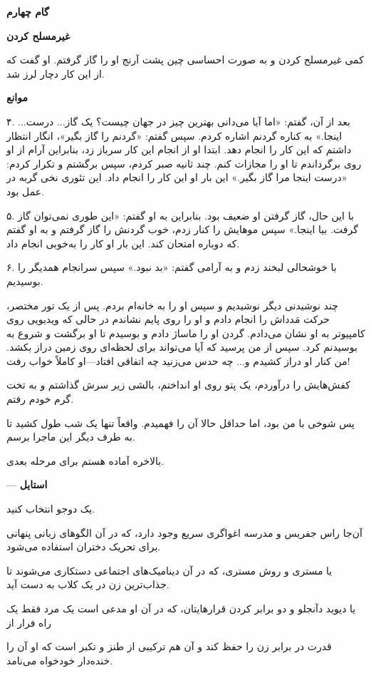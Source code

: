 \textbf{گام چهارم}

\textbf{غیرمسلح کردن}

کمی غیرمسلح کردن و به صورت احساسی چین پشت آرنج او را گاز گرفتم. او گفت که از این کار دچار لرز شد.

\textbf{موانع}

۴. بعد از آن، گفتم: «اما آیا می‌دانی بهترین چیز در جهان چیست؟ یک گاز... درست... اینجا.» به کناره گردنم اشاره کردم. سپس گفتم: «گردنم را گاز بگیر»، انگار انتظار داشتم که این کار را انجام دهد. ابتدا او از انجام این کار سرباز زد، بنابراین آرام از او روی برگرداندم تا او را مجازات کنم. چند ثانیه صبر کردم، سپس برگشتم و تکرار کردم: «درست اینجا مرا گاز بگیر.» این بار او این کار را انجام داد. این تئوری نخی گربه در عمل بود.

۵. با این حال، گاز گرفتن او ضعیف بود. بنابراین به او گفتم: «این طوری نمی‌توان گاز گرفت. بیا اینجا.» سپس موهایش را کنار زدم، خوب گردنش را گاز گرفتم و به او گفتم که دوباره امتحان کند. این بار او کار را به‌خوبی انجام داد.

۶. با خوشحالی لبخند زدم و به آرامی گفتم: «بد نبود.» سپس سرانجام همدیگر را بوسیدیم.

چند نوشیدنی دیگر نوشیدیم و سپس او را به خانه‌ام بردم. پس از یک تور مختصر، حرکت مَدداش را انجام دادم و او را روی پایم نشاندم در حالی که ویدیویی روی کامپیوتر به او نشان می‌دادم. گردن او را ماساژ دادم و بوسیدم تا او برگشت و شروع به بوسیدنم کرد. سپس از من پرسید که آیا می‌تواند برای لحظه‌ای روی زمین دراز بکشد. من کنار او دراز کشیدم و... چه حدس می‌زنید چه اتفاقی افتاد—او کاملاً خواب رفت!

کفش‌هایش را درآوردم، یک پتو روی او انداختم، بالشی زیر سرش گذاشتم و به تخت گرم خودم رفتم.

پس شوخی با من بود، اما حداقل حالا آن را فهمیدم. واقعاً تنها یک شب طول کشید تا به طرف دیگر این ماجرا برسم.

بالاخره آماده هستم برای مرحله بعدی.

— \textbf{استایل}

یک دوجو انتخاب کنید.

آن‌جا راس جفریس و مدرسه اغواگری سریع وجود دارد، که در آن الگوهای زبانی پنهانی برای تحریک دختران استفاده می‌شود.

یا مستری و روش مستری، که در آن دینامیک‌های اجتماعی دستکاری می‌شوند تا جذاب‌ترین زن در یک کلاب به دست آید.

یا دیوید دآنجلو و دو برابر کردن قرارهایتان، که در آن او مدعی است یک مرد فقط یک راه فرار از 

قدرت در برابر زن را حفظ کند و آن هم ترکیبی از طنز و تکبر است که او آن را خنده‌دار خودخواه می‌نامد.

